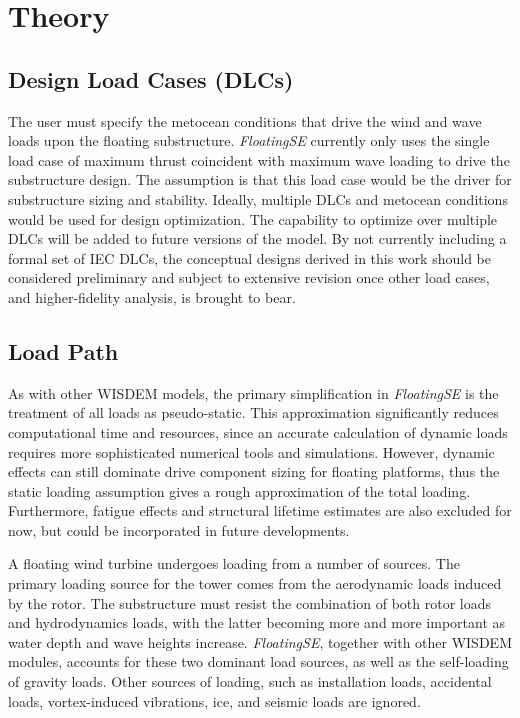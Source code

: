 \chapter{Theory}
\label{sec:theory}


\section{Design Load Cases (DLCs)}
The user must specify the metocean conditions that drive the wind and
wave loads upon the floating substructure.  \textit{FloatingSE}
currently only uses the single load case of maximum thrust coincident
with maximum wave loading to drive the substructure design. The
assumption is that this load case would be the driver for substructure
sizing and stability.  Ideally, multiple DLCs and metocean conditions
would be used for design optimization.  The capability to optimize over
multiple DLCs will be added to future versions of the model.  By not
currently including a formal set of IEC DLCs, the conceptual designs
derived in this work should be considered preliminary and subject to
extensive revision once other load cases, and higher-fidelity analysis,
is brought to bear.

\section{Load Path}
As with other WISDEM models, the primary simplification in
\textit{FloatingSE} is the treatment of all loads as pseudo-static. This
approximation significantly reduces computational time and resources,
since an accurate calculation of dynamic loads requires more
sophisticated numerical tools and simulations.  However, dynamic effects
can still dominate drive component sizing for floating platforms, thus
the static loading assumption gives a rough approximation of the total
loading.  Furthermore, fatigue effects and structural lifetime estimates
are also excluded for now, but could be incorporated in future
developments.

A floating wind turbine undergoes loading from a number of sources.  The
primary loading source for the tower comes from the aerodynamic loads
induced by the rotor. The substructure must resist the combination of
both rotor loads and hydrodynamics loads, with the latter becoming more
and more important as water depth and wave heights increase.
\textit{FloatingSE}, together with other WISDEM modules, accounts for
these two dominant load sources, as well as the self-loading of gravity
loads.  Other sources of loading, such as installation loads, accidental
loads, vortex-induced vibrations, ice, and seismic loads are ignored.


